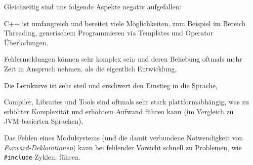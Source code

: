 Gleichzeitig sind uns folgende Aspekte negativ aufgefallen:
\begin{sitemize}{-0.3cm}
  \item C++ ist umfangreich und bereitet viele Möglichkeiten, zum Beispiel im
  Bereich Threading, generischem Programmieren via Templates und Operator
  Überladungen,
  \item Fehlermeldungen können sehr komplex sein und deren Behebung oftmals mehr
  Zeit in Anspruch nehmen, als die eigentlich Entwicklung,
  \item Die Lernkurve ist sehr steil und erschwert den Einstieg in die Sprache,
  \item Compiler, Libraries und Tools sind oftmals sehr stark plattformabhängig,
  was zu erhöhter Komplexität und erhöhtem Aufwand führen kann (im Vergleich
  zu JVM-basierten Sprachen),
  \item Das Fehlen eines Modulsystems (und die damit verbundene Notwendigkeit
  von \emph{Forward-Deklarationen}) kann bei fehlender Vorsicht schnell zu
  Problemen, wie \texttt{\#include}-Zyklen, führen.
\end{sitemize}
